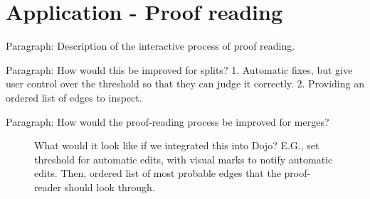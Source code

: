 \section{Application - Proof reading}

Paragraph: Description of the interactive process of proof reading.

Paragraph: How would this be improved for splits? 1. Automatic fixes, but give user control over the threshold so that they can judge it correctly. 2. Providing an ordered list of edges to inspect.

Paragraph: How would the proof-reading process be improved for merges?

\begin{figure}
\caption{What would it look like if we integrated this into Dojo? E.G., set threshold for automatic edits, with visual marks to notify automatic edits. Then, ordered list of most probable edges that the proof-reader should look through.}
\end{figure}